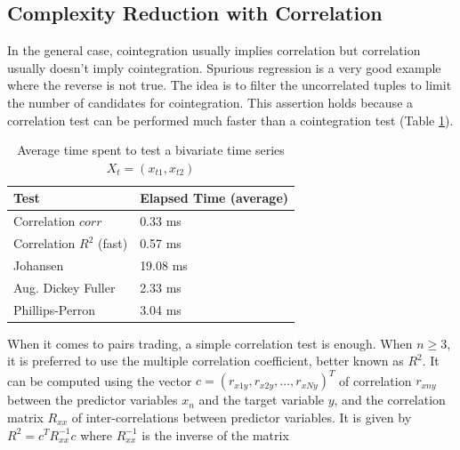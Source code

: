 \documentclass[11pt,a4,twosided,singlespacing,titlepagenumber=on]{scrreprt}
\numberwithin{equation}{chapter} %
\theoremstyle{remark}
\begin{document}
\subsection{Complexity Reduction with Correlation}
\label{Complexity_Reduction_with_Correlation}
In the general case, cointegration usually implies correlation but correlation usually doesn't imply cointegration. Spurious regression is a very good example where the reverse is not true. The idea is to filter the uncorrelated tuples to limit the number of candidates for cointegration. This assertion holds because a correlation test can be performed much faster than a cointegration test (Table \ref{time_spent_test_bivariate}).

\begin{table}[H]
\centering
\begin{tabular}{ll}
\hline
\multicolumn{1}{|l|}{Test}     & \multicolumn{1}{l|}{Elapsed Time (average)} \\ \hline
Correlation $corr$						 &  0.33 ms \\
Correlation $R^2$ (fast)       &  0.57 ms \\
Johansen                       &  19.08 ms\\
Aug. Dickey Fuller             &  2.33 ms\\
Phillips-Perron                &  3.04 ms\\
\hline
\end{tabular}
\caption{Average time spent to test a bivariate time series $X_t = (x_{t1}, x_{t2})$}
\label{time_spent_test_bivariate}
\end{table}


When it comes to pairs trading, a simple correlation test is enough. When $n \geq 3$, it is preferred to use the multiple correlation coefficient, better known as $R^2$. It can be computed using the vector $c = (r_{x1y}, r_{x2y},...,r_{xNy})^T$ of correlation $r_{xny}$ between the predictor variables $x_n$ and the target variable $y$, and the correlation matrix $R_{xx}$ of inter-correlations between predictor variables. It is given by $R^2 = c^T R_{xx}^{-1}c$ where $R_{xx}^{-1}$ is the inverse of the matrix
\end{document}
